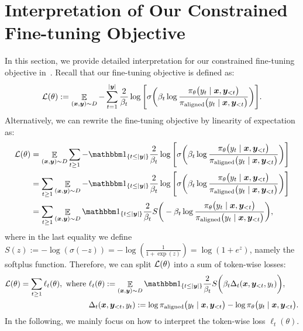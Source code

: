 \section{Interpretation of Our Constrained Fine-tuning Objective}
\label{appendix:derivation_of_loss_regularization}

In this section, we provide detailed interpretation for our constrained fine-tuning objective in~.
Recall that our fine-tuning objective is defined as:
\begin{equation}
    \mathcal{L}(\theta) := \mathop{\mathbb E}_{(\bm{x},\bm{y})\sim D} -  \sum_{t=1}^{|\bm{y}|} \frac{2}{\beta_t} \log\Bigg[\sigma \bigg( \beta_t \log \frac{\pi_{\theta}\big(y_t \mid \bm{x}, \bm{y}_{<t} \big)}{\pi_{\mathrm{aligned}}\big(y_t \mid \bm{x}, \bm{y}_{<t} \big)}  \bigg)  \Bigg].
\end{equation}
Alternatively, we can rewrite the fine-tuning objective by linearity of expectation as:
\begin{align}
    \cL(\theta)
    &= \mathop{\mathbb E}_{(\bx,\by)\sim D} \sum_{t \ge 1} -\onec{t \le |\by|}\frac{2}{\beta_t} \log\Bigg[\sigma \bigg( \beta_t \log \frac{\pi_{\theta}\big(y_t \mid \bx, \by_{<t} \big)}{\pialigned\big(y_t \mid \bx, \by_{<t} \big)}  \bigg)  \Bigg] \\
    &= \sum_{t \ge 1} \mathop{\mathbb E}_{(\bx,\by)\sim D}  -\onec{t \le |\by|} \frac{2}{\beta_t} \log\Bigg[\sigma \bigg( \beta_t \log \frac{\pi_{\theta}\big(y_t \mid \bx, \by_{<t} \big)}{\pialigned\big(y_t \mid \bx, \by_{<t} \big)}  \bigg)  \Bigg] \\
    &= \sum_{t \ge 1} \mathop{\mathbb E}_{(\bx,\by)\sim D}  \onec{t \le |\by|} \frac{2}{\beta_t} S\bigg(-\beta_t \log \frac{\pi_{\theta}\big(y_t \mid \bx, \by_{<t} \big)}{\pialigned\big(y_t \mid \bx, \by_{<t} \big)}  \bigg),
\end{align}
where in the last equality we define $S(z) := -\log(\sigma(-z)) = -\log(\frac{1}{1 + \exp(z)}) = \log(1 + e^z)$, namely the softplus function.
Therefore, we can split $\mathcal{L}(\theta)$ into a sum of token-wise losses:
\begin{align}
    \cL(\theta) = \sum_{t \ge 1} \ell_t(\theta),~\text{where}~&\ell_t(\theta) :=  \mathop{\mathbb E}_{(\bx,\by)\sim D}  \onec{t \le |\by|} \frac{2}{\beta_t} S\bigg( \beta_t \Delta_t(\bx, \by_{<t}, y_t) \bigg), \label{eqn:soft-sft-token-wise-loss-decouping}\\
    & \Delta_t(\bx, \by_{<t}, y_t) := \log \pialigned\big(y_t \mid \bx, \by_{<t} \big) - \log \pi_{\theta}\big(y_t \mid \bx, \by_{<t} \big). \label{eqn:delta-term-in-loss}
\end{align}
In the following, we mainly focus on how to interpret the token-wise loss $\ell_t(\theta)$.


